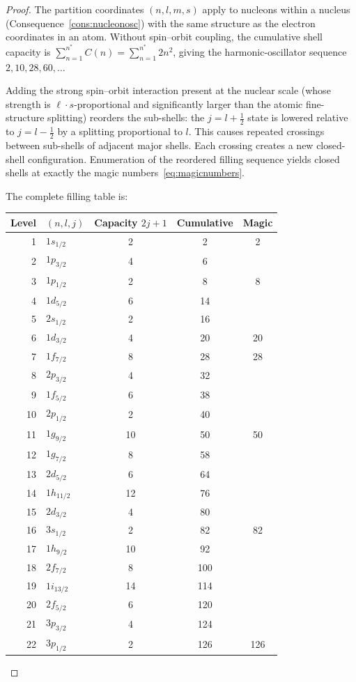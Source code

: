 \begin{proof}
The partition coordinates $(n,l,m,s)$ apply to nucleons within a nucleus
(Consequence~\ref{cons:nucleonosc}) with the same structure as the
electron coordinates in an atom.  Without spin--orbit coupling, the
cumulative shell capacity is $\sum_{n=1}^{n^{*}}C(n)=\sum_{n=1}^{n^{*}}2n^{2}$,
giving the harmonic-oscillator sequence $2,10,28,60,\ldots$

Adding the strong spin--orbit interaction present at the nuclear scale
(whose strength is $\ell\cdot s$-proportional and significantly larger than
the atomic fine-structure splitting) reorders the sub-shells: the
$j=l+\tfrac{1}{2}$ state is lowered relative to $j=l-\tfrac{1}{2}$ by a
splitting proportional to $l$.  This causes repeated crossings between
sub-shells of adjacent major shells.  Each crossing creates a new
closed-shell configuration.  Enumeration of the reordered filling sequence
\citep{mayer1949,haxeljensensuess1949,bohrmottelson1969,krane1988} yields
closed shells at exactly the magic numbers~\eqref{eq:magicnumbers}.

The complete filling table is:
\begin{center}
\begin{tabular}{r|l|c|c|c}
\toprule
Level & $(n,l,j)$ & Capacity $2j+1$ & Cumulative & Magic \\
\midrule
 1 & $1s_{1/2}$   &  2 &   2 & 2   \\
 2 & $1p_{3/2}$   &  4 &   6 &     \\
 3 & $1p_{1/2}$   &  2 &   8 & 8   \\
 4 & $1d_{5/2}$   &  6 &  14 &     \\
 5 & $2s_{1/2}$   &  2 &  16 &     \\
 6 & $1d_{3/2}$   &  4 &  20 & 20  \\
 7 & $1f_{7/2}$   &  8 &  28 & 28  \\
 8 & $2p_{3/2}$   &  4 &  32 &     \\
 9 & $1f_{5/2}$   &  6 &  38 &     \\
10 & $2p_{1/2}$   &  2 &  40 &     \\
11 & $1g_{9/2}$   & 10 &  50 & 50  \\
12 & $1g_{7/2}$   &  8 &  58 &     \\
13 & $2d_{5/2}$   &  6 &  64 &     \\
14 & $1h_{11/2}$  & 12 &  76 &     \\
15 & $2d_{3/2}$   &  4 &  80 &     \\
16 & $3s_{1/2}$   &  2 &  82 & 82  \\
17 & $1h_{9/2}$   & 10 &  92 &     \\
18 & $2f_{7/2}$   &  8 & 100 &     \\
19 & $1i_{13/2}$  & 14 & 114 &     \\
20 & $2f_{5/2}$   &  6 & 120 &     \\
21 & $3p_{3/2}$   &  4 & 124 &     \\
22 & $3p_{1/2}$   &  2 & 126 & 126 \\
\bottomrule
\end{tabular}
\end{center}


\end{proof}
